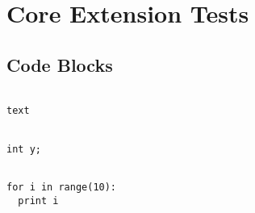 \documentclass{book}
\begin{document}
\chapter{\label{core-extension-tests}Core Extension Tests}

\section{\label{code-blocks}Code Blocks}

\begin{verbatim}

text

\end{verbatim}

\begin{verbatim}

int y;

\end{verbatim}

\begin{verbatim}

for i in range(10):
  print i

\end{verbatim}
\end{document}
